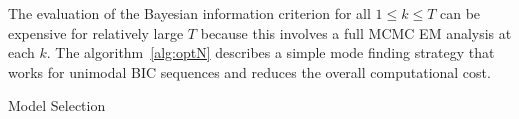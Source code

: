 \documentclass{bioinfo}
\makeatletter
\def\BState{\State\hskip-\ALG@thistlm}
\makeatother
\begin{document}
The evaluation of the Bayesian information criterion for all
$1\leq k \leq T$ can be expensive for relatively large $T$
because this involves a full MCMC EM analysis at each $k$. The
algorithm~\ref{alg:optN} describes a simple mode finding strategy that 
works for unimodal BIC sequences and reduces the overall computational
cost.  



\begin{algorithm}
\caption{Model Selection}\label{alg:optN}
\end{algorithm}
\end{document}
